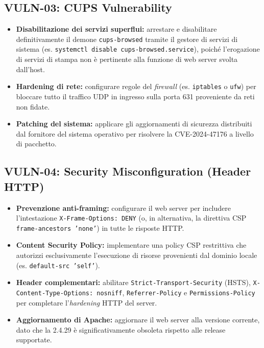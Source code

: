 \documentclass[11pt]{report}
\begin{document}
	\subsection{VULN-03: CUPS Vulnerability}
	\begin{itemize}[leftmargin=*]
		\item \textbf{Disabilitazione dei servizi superflui:} arrestare e disabilitare definitivamente il demone \texttt{cups-browsed} tramite il gestore di servizi di sistema (es. \texttt{systemctl disable cups-browsed.service}), poiché l'erogazione di servizi di stampa non è pertinente alla funzione di web server svolta dall'host.
		\item \textbf{Hardening di rete:} configurare regole del \textit{firewall} (es. \texttt{iptables} o \texttt{ufw}) per bloccare tutto il traffico UDP in ingresso sulla porta 631 proveniente da reti non fidate.
		\item \textbf{Patching del sistema:} applicare gli aggiornamenti di sicurezza distribuiti dal fornitore del sistema operativo per risolvere la CVE-2024-47176 a livello di pacchetto.
	\end{itemize}
	
	\subsection{VULN-04: Security Misconfiguration (Header HTTP)}
	\begin{itemize}[leftmargin=*]
		\item \textbf{Prevenzione anti-framing:} configurare il web server per includere l'intestazione \texttt{X-Frame-Options: DENY} (o, in alternativa, la direttiva CSP \texttt{frame-ancestors 'none'}) in tutte le risposte HTTP.
		\item \textbf{Content Security Policy:} implementare una policy CSP restrittiva che autorizzi esclusivamente l'esecuzione di risorse provenienti dal dominio locale (es. \texttt{default-src 'self'}).
		\item \textbf{Header complementari:} abilitare \texttt{Strict-Transport-Security} (HSTS), \texttt{X-Content-Type-Options: nosniff}, \texttt{Referrer-Policy} e \texttt{Permissions-Policy} per completare l'\textit{hardening} HTTP del server.
		\item \textbf{Aggiornamento di Apache:} aggiornare il web server alla versione corrente, dato che la 2.4.29 è significativamente obsoleta rispetto alle release supportate.
	\end{itemize}
	
\end{document}
